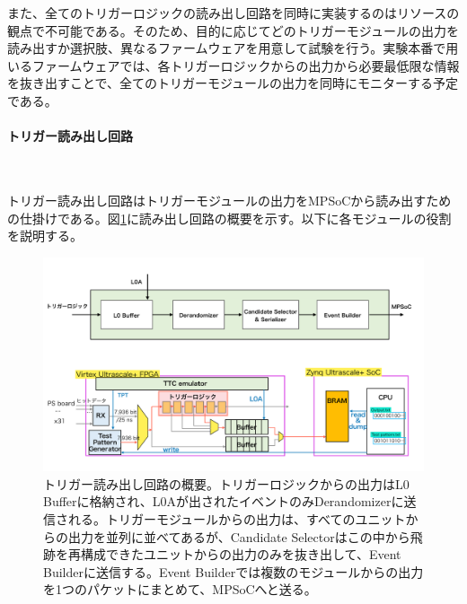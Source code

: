 また、全てのトリガーロジックの読み出し回路を同時に実装するのはリソースの観点で不可能である。そのため、目的に応じてどのトリガーモジュールの出力を読み出すか選択肢、異なるファームウェアを用意して試験を行う。実験本番で用いるファームウェアでは、各トリガーロジックからの出力から必要最低限な情報を抜き出すことで、全てのトリガーモジュールの出力を同時にモニターする予定である。

\paragraph{トリガー読み出し回路}　　
\par
トリガー読み出し回路はトリガーモジュールの出力をMPSoCから読み出すための仕掛けである。図\ref{Readout_Circuite}に読み出し回路の概要を示す。以下に各モジュールの役割を説明する。

\begin{figure} 
\centering
\includegraphics[width=16cm]{fig/Test/Readout_Circuite.pdf}
\caption[トリガー読み出し回路の概要]{トリガー読み出し回路の概要。トリガーロジックからの出力はL0 Bufferに格納され、L0Aが出されたイベントのみDerandomizerに送信される。トリガーモジュールからの出力は、すべてのユニットからの出力を並列に並べてあるが、Candidate Selectorはこの中から飛跡を再構成できたユニットからの出力のみを抜き出して、Event Builderに送信する。Event Builderでは複数のモジュールからの出力を1つのパケットにまとめて、MPSoCへと送る。}
\label{Readout_Circuite}
\end{figure}

